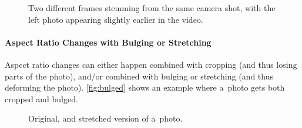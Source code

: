 \begin{figure}[h!]
  \centering
  \caption[Two different frames stemming from the same camera shot]
    {Two different frames stemming from the same camera shot,
    with the left photo appearing slightly earlier in the video.}
  \label{fig:camera-shot}  
\end{figure}

\paragraph{Aspect Ratio Changes with Bulging or Stretching}

Aspect ratio changes can either happen combined with cropping
(and thus losing parts of the photo), and/or combined with 
bulging or stretching (and thus deforming the photo).
\autoref{fig:bulged} shows an example where a~photo gets
both cropped and bulged.

\begin{figure}[h!]
  \centering
  \caption{Original, and stretched version of a~photo.}
  \label{fig:bulged}  
\end{figure}

